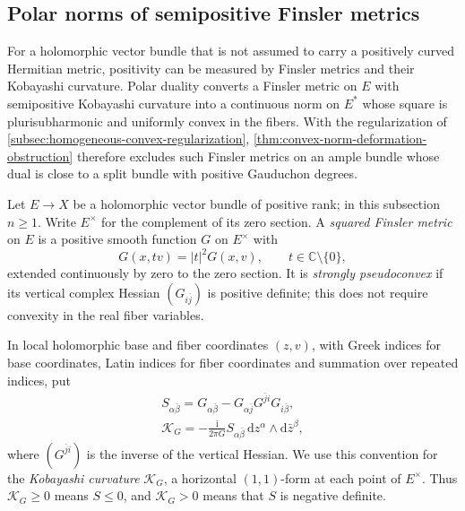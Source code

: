 \subsection{Polar norms of semipositive Finsler metrics}
\label{subsec:polar-finsler-convexity}

For a holomorphic vector bundle that is not assumed to carry a positively curved Hermitian metric, positivity can be measured by Finsler metrics and their Kobayashi curvature. Polar duality converts a Finsler metric on $E$ with semipositive Kobayashi curvature into a continuous norm on $E^*$ whose square is plurisubharmonic and uniformly convex in the fibers. With the regularization of \cref{subsec:homogeneous-convex-regularization}, \cref{thm:convex-norm-deformation-obstruction} therefore excludes such Finsler metrics on an ample bundle whose dual is close to a split bundle with positive Gauduchon degrees.

Let $E\to X$ be a holomorphic vector bundle of positive rank; in this subsection $n\geq1$. Write $E^\times$ for the complement of its zero section. A \emph{squared Finsler metric} on $E$ is a positive smooth function $G$ on $E^\times$ with
\[
 G(x,tv)=|t|^2G(x,v),\qquad t\in\mathbb C\setminus\{0\},
\]
extended continuously by zero to the zero section. It is \emph{strongly pseudoconvex} if its vertical complex Hessian $(G_{i\bar j})$ is positive definite; this does not require convexity in the real fiber variables.

In local holomorphic base and fiber coordinates $(z,v)$, with Greek indices for base coordinates, Latin indices for fiber coordinates and summation over repeated indices, put
\[
 \begin{gathered}
 S_{\alpha\bar\beta}
 =G_{\alpha\bar\beta}
  -G_{\alpha\bar j}G^{\bar j i}G_{i\bar\beta},\\
 \mathcal K_G=-\frac{\mathrm i}{2\pi G}
 S_{\alpha\bar\beta}\,\mathrm dz^\alpha\wedge\mathrm d\bar z^\beta,
 \end{gathered}
\]
where $(G^{\bar j i})$ is the inverse of the vertical Hessian. We use this convention for the \emph{Kobayashi curvature} $\mathcal K_G$, a horizontal $(1,1)$-form at each point of $E^\times$. Thus $\mathcal K_G\geq0$ means $S\leq0$, and $\mathcal K_G>0$ means that $S$ is negative definite.

